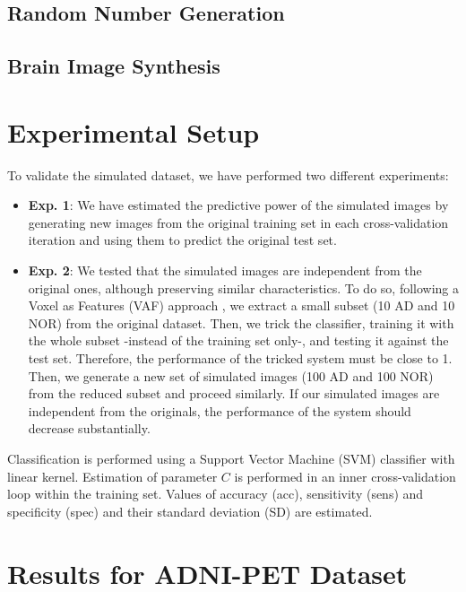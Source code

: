 \subsection{Random Number Generation}

\subsection{Brain Image Synthesis}
\section{Experimental Setup}

To validate the simulated dataset, we have performed two different experiments: 
\begin{itemize}
	\item \textbf{Exp. 1}: We have estimated the predictive power of the simulated images by generating new images from the original training set in each cross-validation iteration and using them to predict the original test set. 
	\item \textbf{Exp. 2}: We tested that the simulated images are independent from the original ones, although preserving similar characteristics. To do so, following a Voxel as Features (VAF) approach \cite{Stoeckel04}, we extract a small subset (10 AD and 10 NOR) from the original dataset. Then, we trick the classifier, training it with the whole subset -instead of the training set only-, and testing it against the test set. Therefore, the performance of the tricked system must be close to 1. Then, we generate a new set of simulated images (100 AD and 100 NOR) from the reduced subset and proceed similarly. If our simulated images are independent from the originals, the performance of the system should decrease substantially. 
	
	\end{itemize}
	
	Classification is performed using a Support Vector Machine (SVM) classifier with linear kernel. Estimation of parameter $C$ is performed in an inner cross-validation loop within the training set. Values of accuracy (acc), sensitivity (sens) and specificity (spec) and their standard deviation (SD) are estimated. 
	
\section{Results for ADNI-PET Dataset}

